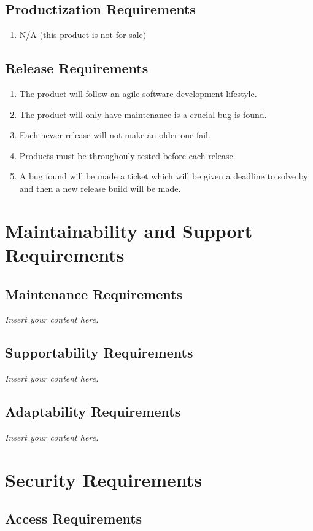 \documentclass[12pt]{article}
\newcommand{\lips}{\textit{Insert your content here.}}
\begin{document}
\subsection{Productization Requirements}
\begin{enumerate}
  \item N/A (this product is not for sale) 
\end{enumerate}
\subsection{Release Requirements}
\begin{enumerate}
  \item The product will follow an agile software development lifestyle.
  \item The product will only have maintenance is a crucial bug is found. 
  \item Each newer release will not make an older one fail. 
  \item Products must be throughouly tested before each release. 
  \item A bug found will be made a ticket which will be given a deadline to solve by and then a new release build will be made.  
\end{enumerate}

\section{Maintainability and Support Requirements}
\subsection{Maintenance Requirements}
\lips
\subsection{Supportability Requirements}
\lips
\subsection{Adaptability Requirements}
\lips

\section{Security Requirements}
\subsection{Access Requirements}
\end{document}
